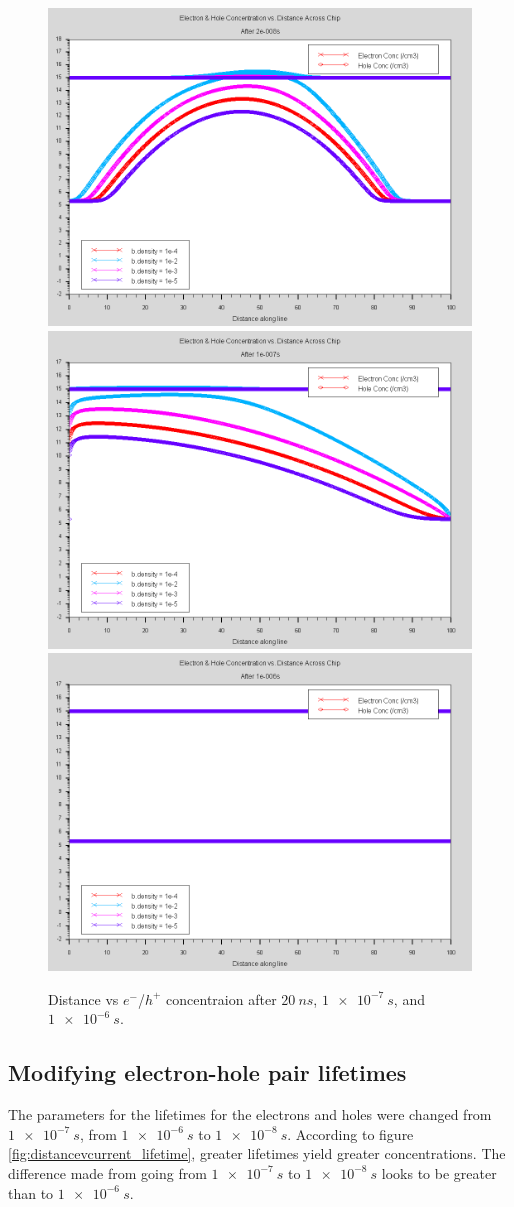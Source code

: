 \documentclass[12pt]{article}
\begin{document}
  \begin{figure}[htp]
    \centering
    \includegraphics[width=.3\textwidth]{density_after2e-008s}\hfill
    \includegraphics[width=.3\textwidth]{density_after1e-007s}\hfill
    \includegraphics[width=.3\textwidth]{density_after1e-006s}
    \caption{Distance vs $e^-$/$h^+$ concentraion after $\SI{20}{ns}$, $\SI{1e-7}{s}$, and $\SI{1e-6}{s}$.}
    \label{fig:distancevcurrent_density}
  \end{figure}

  \subsection{Modifying electron-hole pair lifetimes}
  The parameters for the lifetimes for the electrons and holes were changed from $\SI{1e-7}{s}$, from $\SI{1e-6}{s}$ to $\SI{1e-8}{s}$. According to figure \ref{fig:distancevcurrent_lifetime}, greater lifetimes yield greater concentrations. The difference made from going from $\SI{1e-7}{s}$ to $\SI{1e-8}{s}$ looks to be greater than to $\SI{1e-6}{s}$.
\end{document}
